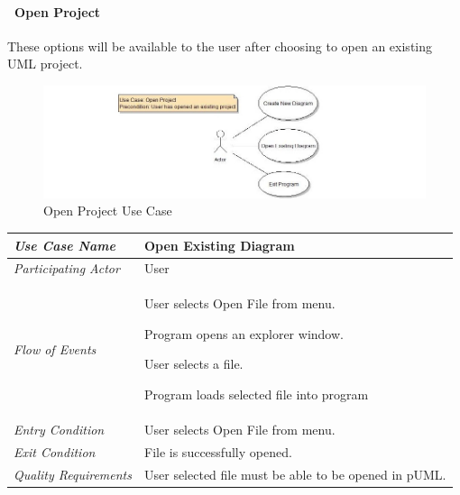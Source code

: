 \documentclass[twoside,letterpaper]{article}
\newenvironment{my_enumerate}{
\begin{enumerate}
  \setlength{\itemsep}{1pt}
  \setlength{\parskip}{0pt}
  \setlength{\parsep}{0pt}}{\end{enumerate}
}
\begin{document}
\clearpage


\paragraph[\ Use Category]
{\ Open Project} {These options will be available to the user after choosing to open an existing UML project.}

\begin{figure}[h]
\centering
\includegraphics[width=6.0in]{ucaseOpenProj.jpg}
\caption{Open Project Use Case}
\end{figure}

\begin{flushleft}
\tablehead{}
\begin{tabular}{|m{2.0in} m{5.0in}|}
\hline
{\bfseries\emph{Use Case Name}}
& {\bfseries Open Existing Diagram}
\\\hline
\emph{Participating Actor}
& User
\\\hline
\emph{Flow of Events}
& \begin{my_enumerate}
\item User selects Open File from menu.
\item Program opens an explorer window.
\item User selects a file.
\item Program loads selected file into program
\end{my_enumerate}
\\\hline
\emph{Entry Condition}
& User selects Open File from menu.
\\\hline
\emph{Exit Condition}
& File is successfully opened.
\\\hline
\emph{Quality Requirements}
& User selected file must be able to be opened in pUML.
\\\hline
\end{tabular}
\end{flushleft}
\bigskip

\clearpage
\end{document}
